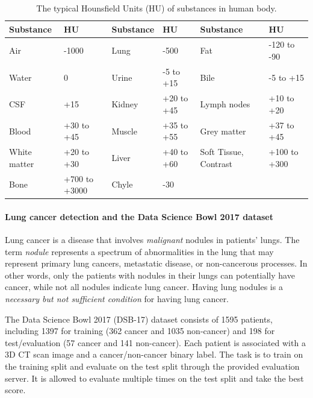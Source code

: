 \documentclass{article}
\begin{document}
\begin{table}[t]
  \begin{center}
  \begin{tabular}{ll|ll|ll}
    \toprule
    Substance & HU & Substance & HU & Substance & HU \\
    \midrule
    Air & -1000         & Lung & -500 & Fat & -120 to -90 \\     Water & 0  & Urine & -5 to +15   & Bile & -5 to +15 \\
    CSF & +15          & Kidney & +20 to +45 & Lymph nodes    & +10 to +20 \\
    Blood & +30 to +45 & Muscle & +35 to +55 & Grey matter & +37 to +45 \\
    White matter & +20 to +30 & Liver & +40 to +60 & Soft Tissue, Contrast & +100 to +300 \\
    Bone & +700 to +3000 & Chyle & -30 \\
    \bottomrule
  \end{tabular}
  \end{center}
  \caption{The typical Hounsfield Units (HU) of substances in human body.}%
  \label{tab:hu_values}
\end{table}

\paragraph{Lung cancer detection and the Data Science Bowl 2017 dataset}
Lung cancer is a disease that involves \textit{malignant} nodules in patients' lungs. The term \textit{nodule} represents a spectrum of abnormalities in the lung that may represent primary lung cancers, metastatic disease, or non-cancerous processes. In other words, only the patients with nodules in their lungs can potentially have cancer, while not all nodules indicate lung cancer. Having lung nodules is a \textit{necessary but not sufficient condition} for having lung cancer.

The Data Science Bowl 2017 (DSB-17) dataset \cite{dsb17} consists of 1595 patients, including 1397 for training (362 cancer and 1035 non-cancer) and 198 for test/evaluation (57 cancer and 141 non-cancer). Each patient is associated with a 3D CT scan image and a cancer/non-cancer binary label. The task is to train on the training split and evaluate on the test split through the provided evaluation server. It is allowed to evaluate multiple times on the test split and take the best score.
\end{document}
